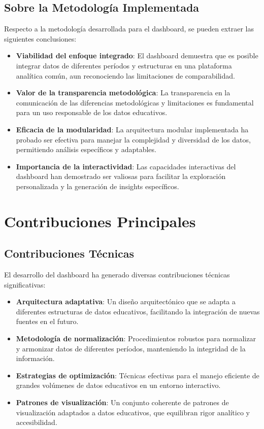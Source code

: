 \subsection{Sobre la Metodología Implementada}
Respecto a la metodología desarrollada para el dashboard, se pueden extraer las siguientes conclusiones:

\begin{itemize}
    \item \textbf{Viabilidad del enfoque integrado}: El dashboard demuestra que es posible integrar datos de diferentes períodos y estructuras en una plataforma analítica común, aun reconociendo las limitaciones de comparabilidad.
    
    \item \textbf{Valor de la transparencia metodológica}: La transparencia en la comunicación de las diferencias metodológicas y limitaciones es fundamental para un uso responsable de los datos educativos.
    
    \item \textbf{Eficacia de la modularidad}: La arquitectura modular implementada ha probado ser efectiva para manejar la complejidad y diversidad de los datos, permitiendo análisis específicos y adaptables.
    
    \item \textbf{Importancia de la interactividad}: Las capacidades interactivas del dashboard han demostrado ser valiosas para facilitar la exploración personalizada y la generación de insights específicos.
\end{itemize}

\section{Contribuciones Principales}

\subsection{Contribuciones Técnicas}
El desarrollo del dashboard ha generado diversas contribuciones técnicas significativas:

\begin{itemize}
    \item \textbf{Arquitectura adaptativa}: Un diseño arquitectónico que se adapta a diferentes estructuras de datos educativos, facilitando la integración de nuevas fuentes en el futuro.
    
    \item \textbf{Metodología de normalización}: Procedimientos robustos para normalizar y armonizar datos de diferentes períodos, manteniendo la integridad de la información.
    
    \item \textbf{Estrategias de optimización}: Técnicas efectivas para el manejo eficiente de grandes volúmenes de datos educativos en un entorno interactivo.
    
    \item \textbf{Patrones de visualización}: Un conjunto coherente de patrones de visualización adaptados a datos educativos, que equilibran rigor analítico y accesibilidad.
\end{itemize}

